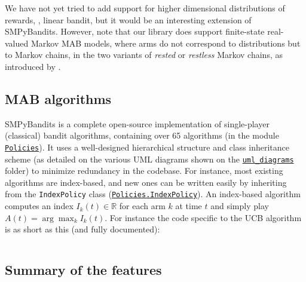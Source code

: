 We have not yet tried to add support for higher dimensional distributions of rewards, \eg, linear bandit, but it would be an interesting extension of SMPyBandits.
%
However, note that our library does support finite-state real-valued Markov MAB models, where arms do not correspond to distributions but to Markov chains, in the two variants of \emph{rested} or \emph{restless} Markov chains, as introduced by \cite{Anantharam87b}.

\subsection{MAB algorithms}

SMPyBandits is a complete open-source implementation of single-player (classical) bandit algorithms,
containing over 65 algorithms (in the module \texttt{\href{https://SMPyBandits.GitHub.io/docs/Policies.html}{Policies}}).
It uses a well-designed hierarchical structure and class inheritance scheme (as detailed on the various UML diagrams shown on the \texttt{\href{https://SMPyBandits.GitHub.io/uml_diagrams/README.html}{uml\_diagrams}} folder) to minimize redundancy in the codebase.
For instance, most existing algorithms are index-based, and new ones can be written easily by inheriting from the \texttt{IndexPolicy} class (\texttt{\href{https://SMPyBandits.GitHub.io/docs/Policies.IndexPolicy.html}{Policies.IndexPolicy}}).
An index-based algorithm computes an index $I_k(t)\in\mathbb{R}$ for each arm $k$ at time $t$ and simply play $A(t) = \arg\max_k I_k(t)$.
For instance the code specific to the UCB algorithm \cite{LaiRobbins85,Auer02} is as short as this (and fully documented):

\begin{small}
    \inputminted[linenos=true,numbersep=5pt,frame=lines,framesep=2mm]{python3}{2-Chapters/3-Chapter/src/example_of_a_IndexPolicy_UCB.py}
\end{small}


\subsection{Summary of the features}

